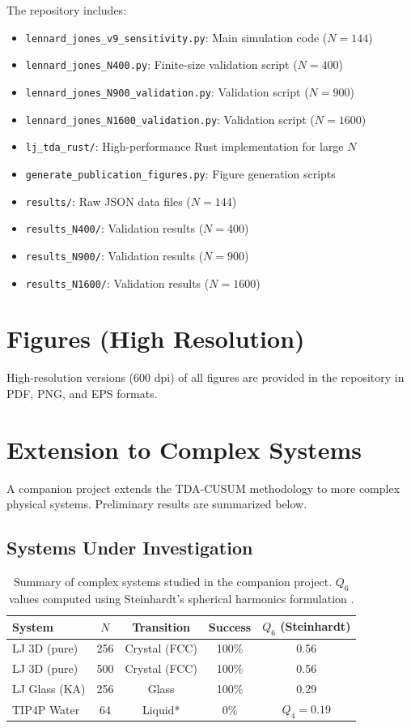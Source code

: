 \documentclass[11pt]{article}
\begin{document}
The repository includes:
\begin{itemize}
    \item \texttt{lennard\_jones\_v9\_sensitivity.py}: Main simulation code ($N=144$)
    \item \texttt{lennard\_jones\_N400.py}: Finite-size validation script ($N=400$)
    \item \texttt{lennard\_jones\_N900\_validation.py}: Validation script ($N=900$)
    \item \texttt{lennard\_jones\_N1600\_validation.py}: Validation script ($N=1600$)
    \item \texttt{lj\_tda\_rust/}: High-performance Rust implementation for large $N$
    \item \texttt{generate\_publication\_figures.py}: Figure generation scripts
    \item \texttt{results/}: Raw JSON data files ($N=144$)
    \item \texttt{results\_N400/}: Validation results ($N=400$)
    \item \texttt{results\_N900/}: Validation results ($N=900$)
    \item \texttt{results\_N1600/}: Validation results ($N=1600$)
\end{itemize}

\section{Figures (High Resolution)}

High-resolution versions (600 dpi) of all figures are provided in the repository in PDF, PNG, and EPS formats.

\section{Extension to Complex Systems}

A companion project extends the TDA-CUSUM methodology to more complex physical systems. Preliminary results are summarized below.

\subsection{Systems Under Investigation}

\begin{table}[h]
\centering
\caption{Summary of complex systems studied in the companion project. $Q_6$ values computed using Steinhardt's spherical harmonics formulation \cite{steinhardt1983}.}
\label{tab:complex}
\begin{tabular}{lcccc}
\toprule
\textbf{System} & \textbf{$N$} & \textbf{Transition} & \textbf{Success} & \textbf{$Q_6$ (Steinhardt)} \\
\midrule
LJ 3D (pure) & 256 & Crystal (FCC) & 100\% & 0.56 \\
LJ 3D (pure) & 500 & Crystal (FCC) & 100\% & 0.56 \\
LJ Glass (KA) & 256 & Glass & 100\% & 0.29 \\
TIP4P Water & 64 & Liquid* & 0\% & $Q_4 = 0.19$ \\
\bottomrule
\end{tabular}
\end{table}
\end{document}
